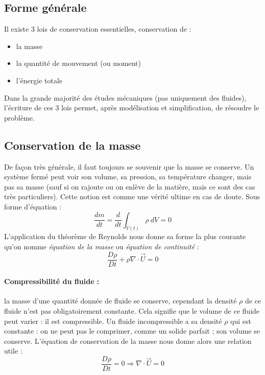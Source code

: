 
\subsection{Forme générale}



Il existe 3 lois de conservation essentielles, conservation de :
\begin{itemize}
    \item la masse
    \item la quantité de mouvement (ou moment)
    \item l'énergie totale
\end{itemize}

Dans la grande majorité des études mécaniques (pas uniquement des fluides), l'écriture de ces 3 lois permet, après modélisation et simplification, de résoudre le problème.


\subsection{Conservation de la masse}
De façon très générale, il faut toujours se souvenir que la masse se conserve. Un système fermé peut voir son volume, sa pression, sa température changer, mais pas sa masse (sauf si on rajoute ou on enlève de la matière, mais ce sont des cas très particuliers). Cette notion est comme une vérité ultime en cas de doute. Sous forme d'équation :
%
\begin{equation}
\frac{dm}{dt} = \frac{d}{dt} \int_{V(t)} {\rho~dV} = 0
\end{equation}
%
L'application du théorème de Reynolds nous donne sa forme la plus courante qu'on nomme \textit{équation de la masse} ou \textit{équation de continuité} :
%
\begin{equation}
\frac {D\rho}{Dt} + \rho \nabla \cdot \vec{U} = 0
\label{eq:masse}
\end{equation}
%
\paragraph{Compressibilité du fluide :} la masse d'une quantité donnée de fluide se conserve, cependant la densité $\rho$ de ce fluide n'est pas obligatoirement constante. Cela signifie que le volume de ce fluide peut varier : il est compressible. Un fluide incompressible a sa densité $\rho$ qui est constante : on ne peut pas le comprimer, comme un solide parfait ; son volume se conserve. L'équation de conservation de la masse nous donne alors une relation utile :
%
\begin{equation}
\frac {D\rho}{Dt} = 0 \Rightarrow \nabla \cdot \vec{U} = 0
\end{equation}


